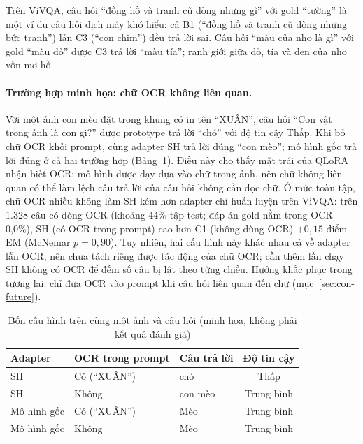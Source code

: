 Trên ViVQA, câu hỏi ``đồng hồ và tranh cũ dòng những gì'' với gold ``tường'' là
một ví dụ câu hỏi dịch máy khó hiểu: cả B1 (``đồng hồ và tranh cũ dòng những bức
tranh'') lẫn C3 (``con chim'') đều trả lời sai. Câu hỏi ``màu của nho là gì'' với
gold ``màu đỏ'' được C3 trả lời ``màu tía''; ranh giới giữa đỏ, tía và đen của
nho vốn mơ hồ.

\paragraph{Trường hợp minh họa: chữ OCR không liên quan.}
\label{par:err-ocr-distractor}
Với một ảnh con mèo đặt trong khung có in tên ``XUÂN'', câu hỏi ``Con vật trong
ảnh là con gì?'' được prototype trả lời ``chó'' với độ tin cậy Thấp. Khi bỏ chữ OCR
khỏi prompt, cùng adapter SH trả lời đúng ``con mèo''; mô hình gốc trả lời đúng ở
cả hai trường hợp (Bảng~\ref{tab:err_ocr_distractor}). Điều này cho thấy mặt trái của
QLoRA nhận biết OCR: mô hình được dạy dựa vào chữ trong ảnh, nên chữ không liên quan
có thể làm lệch câu trả lời của câu hỏi không cần đọc chữ. Ở mức toàn tập, chữ OCR
nhiễu không làm SH kém hơn adapter chỉ huấn luyện trên ViVQA: trên 1.328 câu có dòng
OCR (khoảng 44\% tập test; đáp án gold nằm trong OCR 0,0\%), SH (có OCR trong prompt)
cao hơn C1 (không dùng OCR) $+0{,}15$ điểm EM (McNemar $p = 0{,}90$). Tuy nhiên, hai
cấu hình này khác nhau cả về adapter lẫn OCR, nên chưa tách riêng được tác động của
chữ OCR; cần thêm lần chạy SH không có OCR để đếm số câu bị lật theo từng chiều.
Hướng khắc phục trong tương lai: chỉ đưa OCR vào prompt khi câu hỏi liên quan đến
chữ (mục~\ref{sec:con-future}).

\begin{table}[htbp]
\caption{Bốn cấu hình trên cùng một ảnh và câu hỏi (minh họa, không phải kết quả
đánh giá)}
\label{tab:err_ocr_distractor}
\centering
\small
\begin{tabular}{lllc}
\toprule
\textbf{Adapter} & \textbf{OCR trong prompt} & \textbf{Câu trả lời} & \textbf{Độ tin cậy} \\
\midrule
SH & Có (``XUÂN'') & chó & Thấp \\
SH & Không & con mèo & Trung bình \\
Mô hình gốc & Có (``XUÂN'') & Mèo & Trung bình \\
Mô hình gốc & Không & Mèo & Trung bình \\
\bottomrule
\end{tabular}
\end{table}

